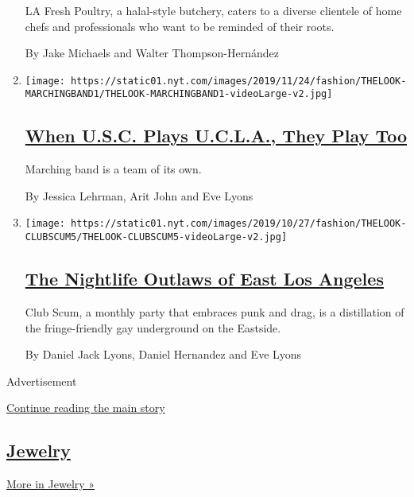 \begin{enumerate}
  LA Fresh Poultry, a halal-style butchery, caters to a diverse
  clientele of home chefs and professionals who want to be reminded of
  their roots.

  By Jake Michaels and Walter Thompson-Hernández
\item
  \texttt{[image: https://static01.nyt.com/images/2019/11/24/fashion/THELOOK-MARCHINGBAND1/THELOOK-MARCHINGBAND1-videoLarge-v2.jpg]}

  \hypertarget{when-usc-plays-ucla-they-play-too}{%
  \subsection{\texorpdfstring{\href{/2019/11/23/style/usc-ucla-marching-band.html}{When
  U.S.C. Plays U.C.L.A., They Play
  Too}}{When U.S.C. Plays U.C.L.A., They Play Too}}\label{when-usc-plays-ucla-they-play-too}}

  Marching band is a team of its own.

  By Jessica Lehrman, Arit John and Eve Lyons
\item
  \texttt{[image: https://static01.nyt.com/images/2019/10/27/fashion/THELOOK-CLUBSCUM5/THELOOK-CLUBSCUM5-videoLarge-v2.jpg]}

  \hypertarget{the-nightlife-outlaws-of-east-los-angeles}{%
  \subsection{\texorpdfstring{\href{/2019/10/19/style/the-nightlife-outlaws-of-east-los-angeles.html}{The
  Nightlife Outlaws of East Los
  Angeles}}{The Nightlife Outlaws of East Los Angeles}}\label{the-nightlife-outlaws-of-east-los-angeles}}

  Club Scum, a monthly party that embraces punk and drag, is a
  distillation of the fringe-friendly gay underground on the Eastside.

  By Daniel Jack Lyons, Daniel Hernandez and Eve Lyons
\end{enumerate}

Advertisement

\protect\hyperlink{after-mid6}{Continue reading the main story}

\hypertarget{jewelry}{%
\subsection{\texorpdfstring{\href{/spotlight/jewelry}{Jewelry}}{Jewelry}}\label{jewelry}}

\href{/spotlight/jewelry}{More in Jewelry »}

